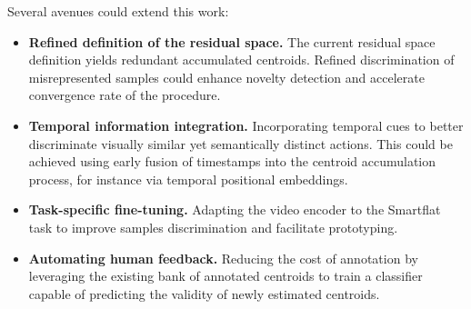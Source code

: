         Several avenues could extend this work:
        \begin{itemize}
            \item \textbf{Refined definition of the residual space.} The current residual space definition yields redundant accumulated centroids. Refined discrimination of misrepresented samples could enhance novelty detection and accelerate convergence rate of the procedure. 
            \item \textbf{Temporal information integration.} Incorporating temporal cues to better discriminate visually similar yet semantically distinct actions. This could be achieved using early fusion of timestamps into the centroid accumulation process, for instance via temporal positional embeddings.
            \item \textbf{Task-specific fine-tuning.} Adapting the video encoder to the Smartflat task to improve samples discrimination and facilitate prototyping. 
            \item \textbf{Automating human feedback.} Reducing the cost of annotation by leveraging the existing bank of annotated centroids to train a classifier capable of predicting the validity of newly estimated centroids.

        \end{itemize}


    